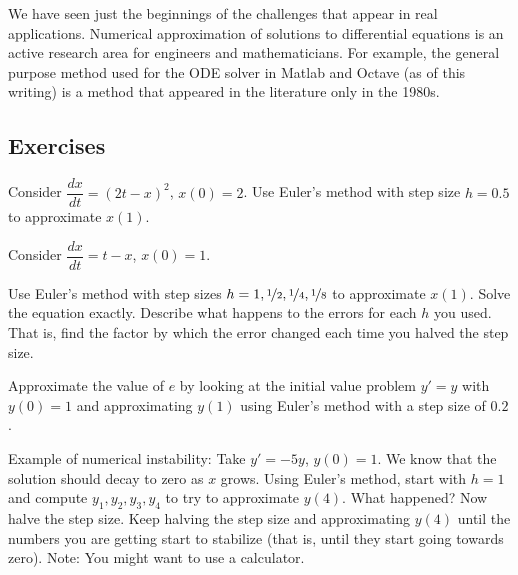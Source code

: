 We have seen just the beginnings of the challenges that appear in real
applications.  Numerical approximation of solutions to differential
equations is an active research area for engineers and mathematicians.  For
example, the general purpose method used for the ODE solver in Matlab and
Octave (as of this writing) is a method that appeared in the literature only
in the 1980s.

\subsection{Exercises}

\begin{exercise}
Consider $\dfrac{dx}{dt} = {(2t-x)}^2$, $x(0)=2$.  Use Euler's method
with step size $h=0.5$ to approximate $x(1)$.
\end{exercise}

\begin{samepage}
\begin{exercise}
Consider $\dfrac{dx}{dt} = t-x$, $x(0)=1$.
\begin{tasks}
\task Use Euler's method
with step sizes $h = 1, \nicefrac{1}{2}, \nicefrac{1}{4}, \nicefrac{1}{8}$ to
approximate
$x(1)$. 
\task Solve the equation exactly.
\task Describe what happens to the
errors for each $h$ you used.  That is, find the factor by which the error
changed each time you halved the step size.
\end{tasks}
\end{exercise}
\end{samepage}

\begin{exercise}
Approximate the value of $e$ by looking at the initial value problem
$y'=y$ with $y(0)=1$ and approximating $y(1)$ using Euler's method with
a step size of $0.2$.
\end{exercise}

\begin{exercise}
Example of numerical instability:
Take $y' = -5y$, $y(0) = 1$.  We know that the
solution should decay to zero as $x$ grows.
Using Euler's method, start with $h=1$ and compute
$y_1, y_2, y_3, y_4$ to try to approximate $y(4)$.  What happened?
Now halve the step size.  Keep halving the step size and approximating $y(4)$
until the numbers you are getting
start to stabilize (that is, until they start going towards zero).
Note: You might want to use a calculator.
\end{exercise}

